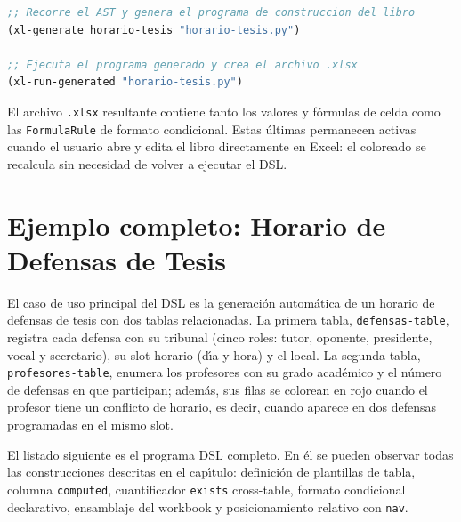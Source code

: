 \documentclass[12pt,a4paper]{report}
\begin{document}
\begin{lstlisting}[language=CommonLisp,
  caption={Compilacion del AST y ejecucion.}]
;; Recorre el AST y genera el programa de construccion del libro
(xl-generate horario-tesis "horario-tesis.py")

;; Ejecuta el programa generado y crea el archivo .xlsx
(xl-run-generated "horario-tesis.py")
\end{lstlisting}

El archivo \texttt{.xlsx} resultante contiene tanto los valores y f\'ormulas
de celda como las \texttt{FormulaRule} de formato condicional.  Estas
\'ultimas permanecen activas cuando el usuario abre y edita el libro
directamente en Excel: el coloreado se recalcula sin necesidad de volver a
ejecutar el DSL.

\section{Ejemplo completo: Horario de Defensas de Tesis}
\label{sec:ejemplo}

El caso de uso principal del DSL es la generaci\'on autom\'atica de un
horario de defensas de tesis con dos tablas relacionadas.  La primera tabla,
\texttt{defensas-table}, registra cada defensa con su tribunal (cinco roles:
tutor, oponente, presidente, vocal y secretario), su slot horario (d\'{\i}a
y hora) y el local.  La segunda tabla, \texttt{profesores-table}, enumera
los profesores con su grado acad\'emico y el n\'umero de defensas en que
participan; adem\'as, sus filas se colorean en rojo cuando el profesor tiene
un conflicto de horario, es decir, cuando aparece en dos defensas
programadas en el mismo slot.

El listado siguiente es el programa DSL completo.  En \'el se pueden
observar todas las construcciones descritas en el cap\'{\i}tulo: definici\'on
de plantillas de tabla, columna \texttt{computed}, cuantificador
\texttt{exists} cross-table, formato condicional declarativo, ensamblaje del
workbook y posicionamiento relativo con \texttt{nav}.
\end{document}
